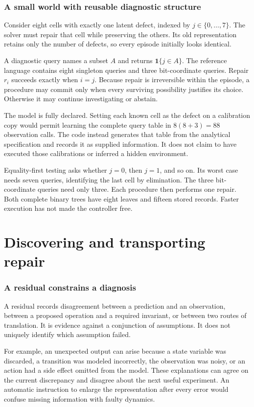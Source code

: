 \documentclass[11pt,letterpaper]{article}
\theoremstyle{plain}
\theoremstyle{definition}
\begin{document}
\section{A small world with reusable diagnostic structure}\label{sec:world}
Consider eight cells with exactly one latent defect, indexed by $j\in\{0,\ldots,7\}$. The solver must repair that cell while preserving the others. Its old representation retains only the number of defects, so every episode initially looks identical.

A diagnostic query names a subset $A$ and returns $\mathbf 1\{j\in A\}$. The reference language contains eight singleton queries and three bit-coordinate queries. Repair $r_i$ succeeds exactly when $i=j$. Because repair is irreversible within the episode, a procedure may commit only when every surviving possibility justifies its choice. Otherwise it may continue investigating or abstain.

The model is fully declared. Setting each known cell as the defect on a calibration copy would permit learning the complete query table in $8(8+3)=88$ observation calls. The code instead generates that table from the analytical specification and records it as supplied information. It does not claim to have executed those calibrations or inferred a hidden environment.

Equality-first testing asks whether $j=0$, then $j=1$, and so on. Its worst case needs seven queries, identifying the last cell by elimination. The three bit-coordinate queries need only three. Each procedure then performs one repair. Both complete binary trees have eight leaves and fifteen stored records. Faster execution has not made the controller free.


\clearpage\part{Discovering and transporting repair}
\section{A residual constrains a diagnosis}\label{sec:diagnosis}
A residual records disagreement between a prediction and an observation, between a proposed operation and a required invariant, or between two routes of translation. It is evidence against a conjunction of assumptions. It does not uniquely identify which assumption failed.

For example, an unexpected output can arise because a state variable was discarded, a transition was modeled incorrectly, the observation was noisy, or an action had a side effect omitted from the model. These explanations can agree on the current discrepancy and disagree about the next useful experiment. An automatic instruction to enlarge the representation after every error would confuse missing information with faulty dynamics.
\end{document}
